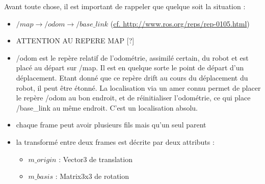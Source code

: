 \documentclass[10pt,a4paper]{article}
\begin{document}
\noindent Avant toute chose, il est important de rappeler que quelque soit la situation :
\begin{itemize}
\item $/map \rightarrow /odom \rightarrow /base\_link $ (\url{cf. http://www.ros.org/reps/rep-0105.html})
\item ATTENTION AU REPERE MAP [?]
\item /odom est le repère relatif de l'odométrie, assimilé certain, du robot et est placé au départ sur /map. Il est en quelque sorte le point de départ d'un déplacement. Etant donné que ce repère drift au cours du déplacement du robot, il peut être étonné. La localisation via un amer connu permet de placer le repère /odom au bon endroit, et de réinitialiser l'odométrie, ce qui place /base\_link au même endroit. C'est un localisation absolu.
\item chaque frame peut avoir plusieurs fils mais qu'un seul parent
\item la transformé entre deux frames est décrite par deux attributs : 
  \begin{itemize}
  \item $m\_origin$ : Vector3 de translation 
  \item $m\_basis$ : Matrix3x3 de rotation
  \end{itemize}
\end{itemize}
\end{document}
